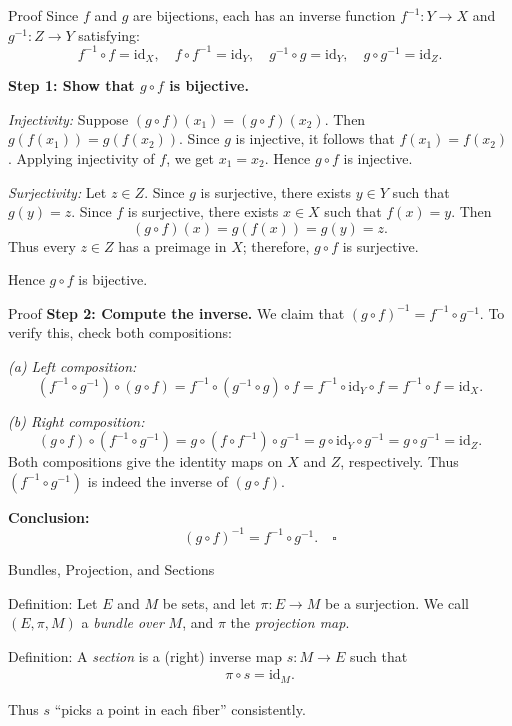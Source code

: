 \begin{frame}{Proof}
    Since \(f\) and \(g\) are bijections, each has an inverse function \(f^{-1}: Y \to X\) and \(g^{-1}: Z \to Y\) satisfying:
\[
f^{-1} \circ f = \mathrm{id}_X, \quad f \circ f^{-1} = \mathrm{id}_Y, \quad
g^{-1} \circ g = \mathrm{id}_Y, \quad g \circ g^{-1} = \mathrm{id}_Z.
\]

\textbf{Step 1: Show that \(g \circ f\) is bijective.}

\emph{Injectivity:}
Suppose \((g\circ f)(x_1) = (g\circ f)(x_2)\).
Then \(g(f(x_1)) = g(f(x_2))\).
Since \(g\) is injective, it follows that \(f(x_1)=f(x_2)\).
Applying injectivity of \(f\), we get \(x_1 = x_2\).
Hence \(g\circ f\) is injective.

\emph{Surjectivity:}
Let \(z \in Z\).
Since \(g\) is surjective, there exists \(y \in Y\) such that \(g(y)=z\).
Since \(f\) is surjective, there exists \(x \in X\) such that \(f(x)=y\).
Then
\[
(g\circ f)(x) = g(f(x)) = g(y) = z.
\]
Thus every \(z \in Z\) has a preimage in \(X\); therefore, \(g\circ f\) is surjective.

Hence \(g\circ f\) is bijective.

\end{frame}
\begin{frame}{Proof}
\textbf{Step 2: Compute the inverse.}
We claim that \((g\circ f)^{-1} = f^{-1} \circ g^{-1}.\) To verify this, check both compositions:

\emph{(a) Left composition:}
\[
(f^{-1} \circ g^{-1}) \circ (g \circ f)
= f^{-1} \circ (g^{-1} \circ g) \circ f
= f^{-1} \circ \mathrm{id}_Y \circ f
= f^{-1} \circ f
= \mathrm{id}_X.
\]

\emph{(b) Right composition:}
\[
(g \circ f) \circ (f^{-1} \circ g^{-1})
= g \circ (f \circ f^{-1}) \circ g^{-1}
= g \circ \mathrm{id}_Y \circ g^{-1}
= g \circ g^{-1}
= \mathrm{id}_Z.
\]
Both compositions give the identity maps on \(X\) and \(Z\), respectively. Thus \((f^{-1} \circ g^{-1})\) is indeed the inverse of \((g \circ f)\).

\textbf{Conclusion:}
\[
(g \circ f)^{-1} = f^{-1} \circ g^{-1}. \quad \square
\]
\end{frame}

\begin{frame}{Bundles, Projection, and Sections}

\begin{block}{Definition:} Let \(E\) and \(M\) be sets, and let \(\pi: E \to M\) be a surjection.
We call \((E, \pi, M)\) a \emph{bundle over} \(M\), and \(\pi\) the \emph{projection map}.
\end{block}

\begin{block}{Definition:}
A \emph{section} is a (right) inverse map \(s: M \to E\) such that
\begin{align*}
\pi \circ s = \mathrm{id}_M.
\end{align*}

Thus \(s\) “picks a point in each fiber” consistently.
\end{block}
\end{frame}

